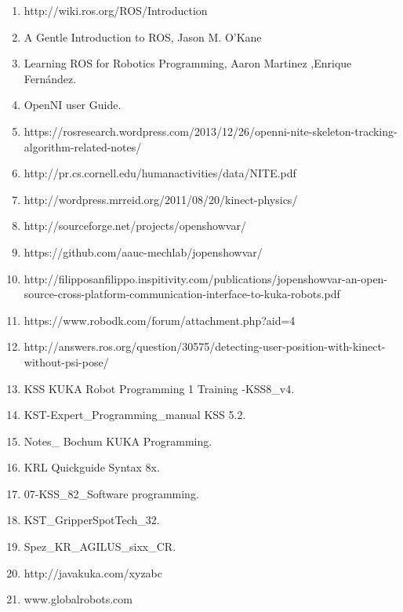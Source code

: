 \documentclass{book}
\begin{document}
\begin{enumerate}
	\item http://wiki.ros.org/ROS/Introduction
	\item A Gentle Introduction to ROS, Jason M. O’Kane
	\item Learning ROS for Robotics Programming, Aaron Martinez ,Enrique Fernández.
	\item OpenNI user Guide.
	\item https://rosresearch.wordpress.com/2013/12/26/openni-nite-skeleton-tracking-algorithm-related-notes/
	\item http://pr.cs.cornell.edu/humanactivities/data/NITE.pdf
	\item http://wordpress.mrreid.org/2011/08/20/kinect-physics/
	\item http://sourceforge.net/projects/openshowvar/
	\item https://github.com/aauc-mechlab/jopenshowvar/
	\item http://filipposanfilippo.inspitivity.com/publications/jopenshowvar-an-open-source-cross-platform-communication-interface-to-kuka-robots.pdf          
	\item https://www.robodk.com/forum/attachment.php?aid=4
	\item http://answers.ros.org/question/30575/detecting-user-position-with-kinect-without-psi-pose/ 
	\item KSS KUKA Robot Programming 1 Training -KSS8\_v4.
	\item KST-Expert\_Programming\_manual KSS 5.2.
	\item Notes\_ Bochum KUKA Programming.
	\item KRL Quickguide Syntax 8x.
	\item 07-KSS\_82\_Software programming.
	\item KST\_GripperSpotTech\_32.
	\item Spez\_KR\_AGILUS\_sixx\_CR.
	\item http://javakuka.com/xyzabc
	\item www.globalrobots.com
	
	
	
	
	
	
		
\end{enumerate}
\end{document}
